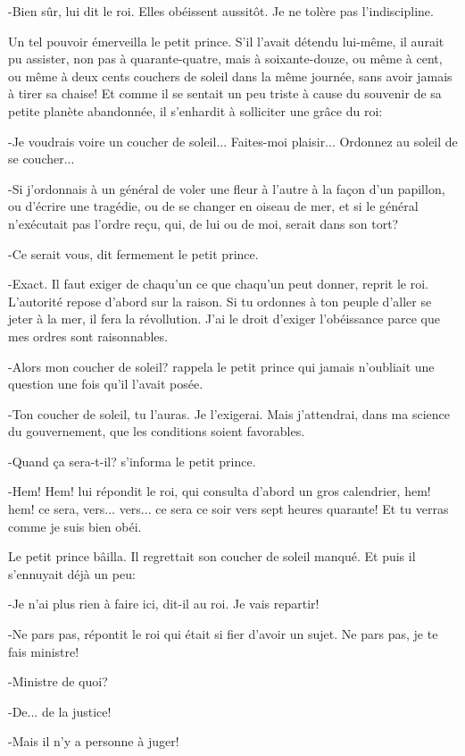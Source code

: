 \documentclass{report}
\begin{document}
-Bien sûr, lui dit le roi. Elles obéissent aussitôt. Je ne tolère pas l'indiscipline.

Un tel pouvoir émerveilla le petit prince. S'il l'avait détendu lui-même, il aurait pu assister, non pas à quarante-quatre, mais à soixante-douze, ou même à cent, ou même à deux cents couchers de soleil dans la même journée, sans avoir jamais à tirer sa chaise! Et comme il se sentait un peu triste à cause du souvenir de sa petite planète abandonnée, il s'enhardit à solliciter une grâce du roi:

-Je voudrais voire un coucher de soleil... Faites-moi plaisir... Ordonnez au soleil de se coucher...

-Si j'ordonnais à un général de voler une fleur à l'autre à la façon d'un papillon, ou d'écrire une tragédie, ou de se changer en oiseau de mer, et si le général n'exécutait pas l'ordre reçu, qui, de lui ou de moi, serait dans son tort?

-Ce serait vous, dit fermement le petit prince.

-Exact. Il faut exiger de chaqu'un ce que chaqu'un peut donner, reprit le roi. L'autorité repose d'abord sur la raison. Si tu ordonnes à ton peuple d'aller se jeter à la mer, il fera la révollution. J'ai le droit d'exiger l'obéissance parce que mes ordres sont raisonnables.

-Alors mon coucher de soleil? rappela le petit prince qui jamais n'oubliait une question une fois qu'il l'avait posée.

-Ton coucher de soleil, tu l'auras. Je l'exigerai. Mais j'attendrai, dans ma science du gouvernement, que les conditions soient favorables.

-Quand ça sera-t-il? s'informa le petit prince.

-Hem! Hem! lui répondit le roi, qui consulta d'abord un gros calendrier, hem! hem! ce sera, vers... vers... ce sera ce soir vers sept heures quarante! Et tu verras comme je suis bien obéi.

Le petit prince bâilla. Il regrettait son coucher de soleil manqué. Et puis il s'ennuyait déjà un peu:

-Je n'ai plus rien à faire ici, dit-il au roi. Je vais repartir!

-Ne pars pas, répontit le roi qui était si fier d'avoir un sujet. Ne pars pas, je te fais ministre!

-Ministre de quoi?

-De... de la justice!

-Mais il n'y a personne à juger!
\end{document}
